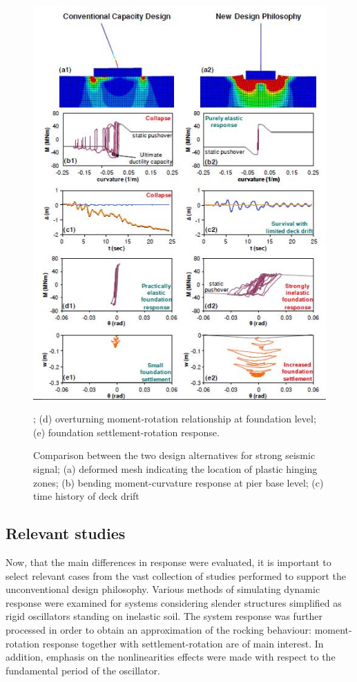 \documentclass[11pt,a4paper]{report}
\begin{document}
\begin{figure}[h!]
	\centering
	\includegraphics[width=0.8\linewidth]{"conventional"}
	\caption{Comparison between the two design alternatives for strong seismic signal; (a) deformed mesh indicating the location of plastic hinging zones; (b) bending moment-curvature response at pier base level; (c) time history of deck drift}; (d) overturning moment-rotation relationship at foundation level; (e) foundation settlement-rotation response.
	\label{conventional}
\end{figure}



\newpage
\subsection{Relevant studies}
Now, that the main differences in response were evaluated, it is important to select \mbox{relevant} cases from the vast collection of studies performed to support the unconventional design philosophy. Various methods of simulating dynamic response were examined for systems considering slender structures simplified as rigid oscillators standing on inelastic soil. The system response was further processed in order to obtain an approximation of the rocking \mbox{behaviour}: moment-rotation response together with settlement-rotation are of main \mbox{interest}. In addition, emphasis on the nonlinearities effects were made with respect to the fundamental period of the oscillator.
\end{document}
